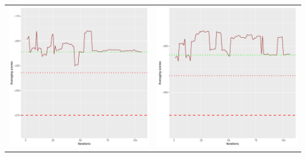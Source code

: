 \documentclass[]{scrartcl}
\begin{document}
\begin{table}[h!]
\begin{tabular}{cc}
\includegraphics[scale = 0.4]{./figs/asia/v4/10/avgBoundsEvolution-107.pdf} & 
\includegraphics[scale = 0.4]{./figs/asia/v4/20/avgBoundsEvolution-107.pdf} \\

\end{tabular}
\end{table}
\end{document}
